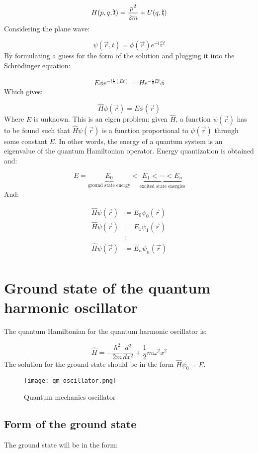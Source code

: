 $$H(p,q, \bcancel{t}) = \frac{p^2}{2m}+U(q,\bcancel{t})$$
\noindent
Considering the plane wave:

$$\psi(\vec{r}, t) = \phi(\vec{r}) e^{-i \frac{E}{\hbar}t}$$
\noindent
By formulating a guess for the form of the solution and plugging it into the Schr\"odinger equation:

$$E\phi e^{-i \frac{i}{\hbar}(Et)} = He^{-\frac{i}{\hbar}Et}\phi$$
\noindent
Which gives:

$$\hat{H}\phi(\vec{r}) = E\phi(\vec{r})$$
\noindent
Where $E$ is unknown.
This is an eigen problem: given $\hat{H}$, a function $\psi(\vec{r})$ has to be found such that $\hat{H}\psi(\vec{r})$ is a function proportional to $\psi(\vec{r})$ through some constant $E$.
In other words, the energy of a quantum system is an eigenvalue of the quantum Hamiltonian operator.
Energy quantization is obtained and:

$$E = \underbrace{E_0}_{\text{ground state energy}} < \underbrace{E_1 < \cdots < E_n}_{\text{excited state energies}}$$
\noindent
And:

\begin{align*}
  \hat{H}\psi(\vec{r}) &= E_0\psi_0(\vec{r})\\
  \hat{H}\psi(\vec{r}) &= E_1\psi_1(\vec{r})\\
                       &\vdots\\
  \hat{H}\psi(\vec{r}) &= E_n\psi_n(\vec{r})\\
\end{align*}

\section{Ground state of the quantum harmonic oscillator}
The quantum Hamiltonian for the quantum harmonic oscillator is:

$$\hat{H} = - \frac{\hbar^2}{2m}\frac{d{^2}}{d{x^2}} +\frac{1}{2}m\omega^2 x^2$$
\noindent
The solution for the ground state should be in the form $\hat{H}\psi_0 = E$.
\begin{figure}[h!]
    \centering
    \texttt{[image: qm\_oscillator.png]}
    \caption{\label{fig:qm_oscillator} Quantum mechanics oscillator }
\end{figure}
  \subsection{Form of the ground state}
  The ground state will be in the form:

